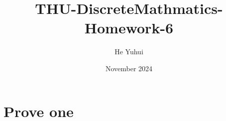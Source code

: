 \documentclass{article}
\title{THU-DiscreteMathmatics-Homework-6}
\author{He Yuhui\quad 2022012050}
\date{November 2024}
\begin{document}
\maketitle

\section{Prove one}
\end{document}

